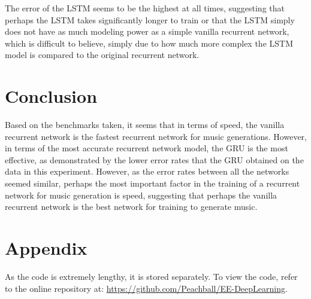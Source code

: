 \documentclass[12pt]{article}
\begin{document}
The error of the LSTM seems to be the highest at all times, suggesting that
perhaps the LSTM takes significantly longer to train or that the LSTM simply
does not have as much modeling power as a simple vanilla recurrent network,
which is difficult to believe, simply due to how much more complex the LSTM
model is compared to the original recurrent network.

\section{Conclusion}
Based on the benchmarks taken, it seems that in terms of speed, the vanilla
recurrent network is the fastest recurrent network for music generations.
However, in terms of the most accurate recurrent network model, the GRU is the
most effective, as demonstrated by the lower error rates that the GRU obtained
on the data in this experiment. However, as the error rates between all the
networks seemed similar, perhaps the most important factor in the training of a
recurrent network for music generation is speed, suggesting that perhaps the
vanilla recurrent network is the best network for training to generate music.

\section{Appendix}
As the code is extremely lengthy, it is stored separately. To view the code,
refer to the online repository at: \url{https://github.com/Peachball/EE-DeepLearning}.
\end{document}
